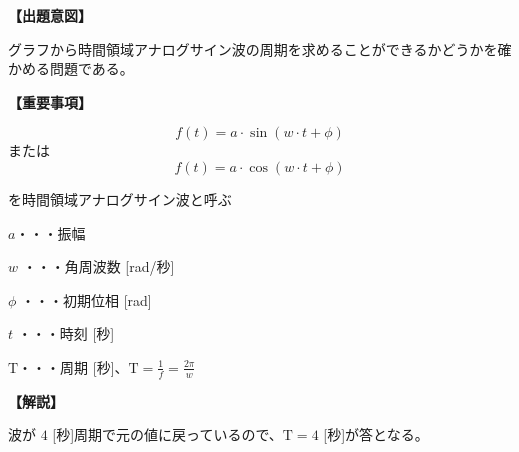 \noindent \textbf{【出題意図】}

\noindent グラフから時間領域アナログサイン波の周期を求めることができるかどうかを確かめる問題である。

\vspace{1em}
\noindent \textbf{【重要事項】}

\[
f(t) = a \cdot \sin( w \cdot t + \phi )
\]
%
\noindent または
%
\[
f(t) = a \cdot \cos( w \cdot t + \phi )
\]

\medskip
\noindent を時間領域アナログサイン波と呼ぶ

\bigskip
\noindent $a$・・・振幅

\bigskip
\noindent $w$ ・・・角周波数 [rad/秒]

\bigskip
\noindent $\phi$ ・・・初期位相 [rad]

\bigskip
\noindent $t$ ・・・時刻 [秒]

\bigskip
$\textrm{T}$・・・周期 [秒]、$\textrm{T} = \frac{1}{f} = \frac{2\pi}{w}$

\vspace{1em}
\noindent \textbf{【解説】}

\noindent 波が $4$ [秒]周期で元の値に戻っているので、$\textrm{T} =4$ [秒]が答となる。
